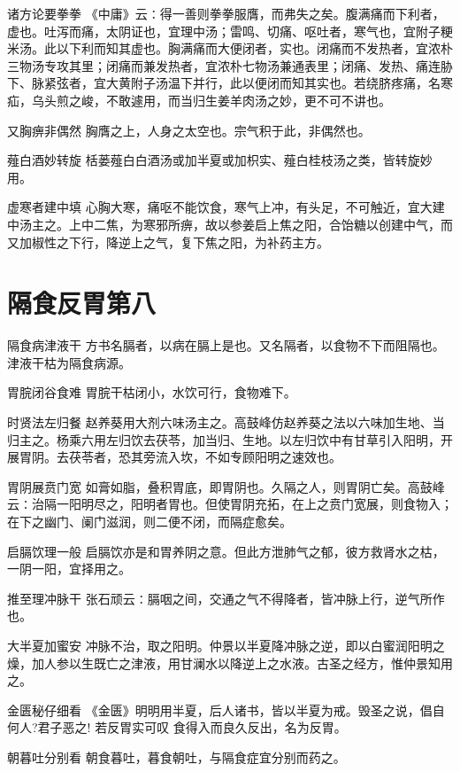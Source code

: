 \documentclass[a4paper,12pt,UTF8,twoside]{ctexbook}
\begin{document}
  诸方论要拳拳
  《中庸》云∶得一善则拳拳服膺，而弗失之矣。腹满痛而下利者，虚也。吐泻而痛，太阴证也，宜理中汤；雷鸣、切痛、呕吐者，寒气也，宜附子粳米汤。此以下利而知其虚也。胸满痛而大便闭者，实也。闭痛而不发热者，宜浓朴三物汤专攻其里；闭痛而兼发热者，宜浓朴七物汤兼通表里；闭痛、发热、痛连胁下、脉紧弦者，宜大黄附子汤温下并行，此以便闭而知其实也。若绕脐疼痛，名寒疝，乌头煎之峻，不敢遽用，而当归生姜羊肉汤之妙，更不可不讲也。
    
  又胸痹非偶然
  胸膺之上，人身之太空也。宗气积于此，非偶然也。
    
  薤白酒妙转旋
  栝蒌薤白白酒汤或加半夏或加枳实、薤白桂枝汤之类，皆转旋妙用。
    
  虚寒者建中填
  心胸大寒，痛呕不能饮食，寒气上冲，有头足，不可触近，宜大建中汤主之。上中二焦，为寒邪所痹，故以参姜启上焦之阳，合饴糖以创建中气，而又加椒性之下行，降逆上之气，复下焦之阳，为补药主方。
        
  \chapter{隔食反胃第八}
    隔食病津液干
    方书名膈者，以病在膈上是也。又名隔者，以食物不下而阻隔也。津液干枯为隔食病源。
    
    胃脘闭谷食难
    胃脘干枯闭小，水饮可行，食物难下。
    
    时贤法左归餐
    赵养葵用大剂六味汤主之。高鼓峰仿赵养葵之法以六味加生地、当归主之。杨乘六用左归饮去茯苓，加当归、生地。以左归饮中有甘草引入阳明，开展胃阴。去茯苓者，恐其旁流入坎，不如专顾阳明之速效也。
    
    胃阴展贲门宽
    如膏如脂，叠积胃底，即胃阴也。久隔之人，则胃阴亡矣。高鼓峰云∶治隔一阳明尽之，阳明者胃也。但使胃阴充拓，在上之贲门宽展，则食物入；在下之幽门、阑门滋润，则二便不闭，而隔症愈矣。
    
    启膈饮理一般
    启膈饮亦是和胃养阴之意。但此方泄肺气之郁，彼方救肾水之枯，一阴一阳，宜择用之。
    
    推至理冲脉干
    张石顽云∶膈咽之间，交通之气不得降者，皆冲脉上行，逆气所作也。
    
    大半夏加蜜安
    冲脉不治，取之阳明。仲景以半夏降冲脉之逆，即以白蜜润阳明之燥，加人参以生既亡之津液，用甘澜水以降逆上之水液。古圣之经方，惟仲景知用之。
    
    金匮秘仔细看
    《金匮》明明用半夏，后人诸书，皆以半夏为戒。毁圣之说，倡自何人?君子恶之!
    若反胃实可叹
    食得入而良久反出，名为反胃。
    
    朝暮吐分别看
    朝食暮吐，暮食朝吐，与隔食症宜分别而药之。
    
\end{document}
